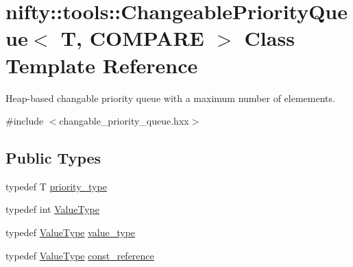 \hypertarget{classnifty_1_1tools_1_1ChangeablePriorityQueue}{}\section{nifty\+:\+:tools\+:\+:Changeable\+Priority\+Queue$<$ T, C\+O\+M\+P\+A\+R\+E $>$ Class Template Reference}
\label{classnifty_1_1tools_1_1ChangeablePriorityQueue}


Heap-\/based changable priority queue with a maximum number of elemements.  




{\ttfamily \#include $<$changable\+\_\+priority\+\_\+queue.\+hxx$>$}

\subsection*{Public Types}
\begin{DoxyCompactItemize}
\item 
typedef T \hyperlink{classnifty_1_1tools_1_1ChangeablePriorityQueue_a6ecafb387f99a1cfa7ff5795c924682c}{priority\+\_\+type}
\item 
typedef int \hyperlink{classnifty_1_1tools_1_1ChangeablePriorityQueue_a3b9e96ad70a62b02b4a117d58f758a1f}{Value\+Type}
\item 
typedef \hyperlink{classnifty_1_1tools_1_1ChangeablePriorityQueue_a3b9e96ad70a62b02b4a117d58f758a1f}{Value\+Type} \hyperlink{classnifty_1_1tools_1_1ChangeablePriorityQueue_aa00fbc748b94bdc6175b4c49bb2bba48}{value\+\_\+type}
\item 
typedef \hyperlink{classnifty_1_1tools_1_1ChangeablePriorityQueue_a3b9e96ad70a62b02b4a117d58f758a1f}{Value\+Type} \hyperlink{classnifty_1_1tools_1_1ChangeablePriorityQueue_acb7eb23bd9ca7c52955adc06bf4816c3}{const\+\_\+reference}
\end{DoxyCompactItemize}
